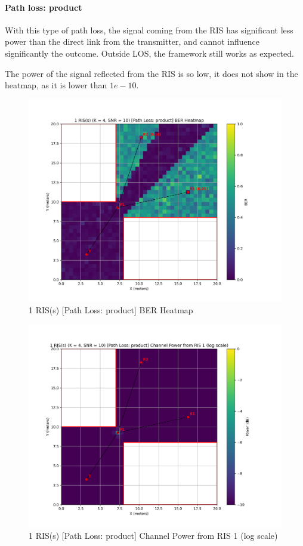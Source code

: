 \paragraph*{Path loss: product}

With this type of path loss, the signal coming from the RIS has significant less power than the direct link from the transmitter, and cannot influence significantly the outcome. Outside LOS, the framework still works as expected.

The power of the signal reflected from the RIS is so low, it does not show in the heatmap, as it is lower than $1e-10$.

\begin{figure}[H]
  \centering
  \includegraphics[width=0.7\linewidth]{imgs/heatmap-simulations/1 RIS(s) (K = 4, SNR = 10) [Path Loss_ product] BER Heatmap.png}
  \caption{1 RIS(s) [Path Loss: product] BER Heatmap}
\end{figure}

\begin{figure}[H]
  \centering
  \includegraphics[width=0.7\linewidth]{imgs/heatmap-simulations/1 RIS(s) (K = 4, SNR = 10) [Path Loss_ product] Channel Power from RIS 1 (log scale).png}
  \caption{1 RIS(s) [Path Loss: product] Channel Power from RIS 1 (log scale)}
\end{figure}

